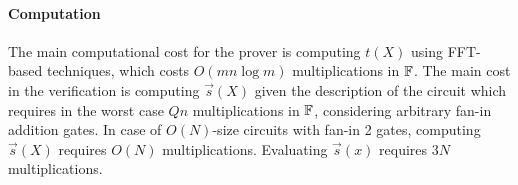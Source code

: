 \paragraph{Computation} The main computational cost for the prover is computing $t(X)$ using FFT-based techniques, which costs $O( mn\log{m})$ multiplications in $\mathbb{F}$.
The main cost in the verification is computing $\vec{s}(X)$ given the description of the circuit which requires in the worst case $Qn$ multiplications in $\mathbb{F}$, considering arbitrary fan-in addition gates. In case of $O(N)$-size circuits with fan-in 2 gates, computing  $\vec{s}(X)$ requires $O(N)$ multiplications. Evaluating $\vec{s}(x)$ requires $3N$ multiplications.